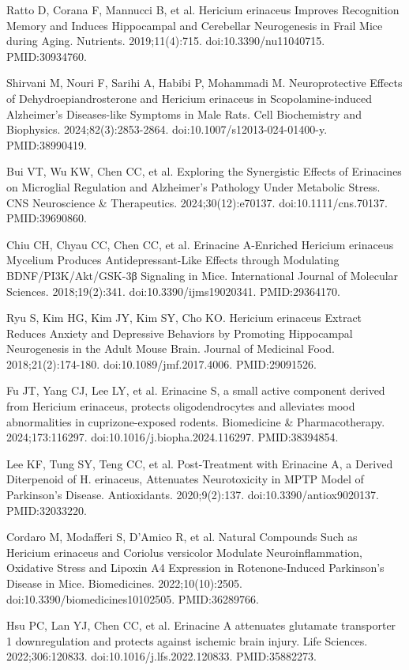 \documentclass[12pt,oneside]{book}
\newcommand{\reff}[2]{\par\hangindent=7mm\hangafter=1\noindent[#1]\hspace{2mm}#2\par}
\begin{document}
\reff{29}{Ratto D, Corana F, Mannucci B, et al. Hericium erinaceus Improves Recognition Memory and Induces Hippocampal and Cerebellar Neurogenesis in Frail Mice during Aging. Nutrients. 2019;11(4):715. doi:10.3390/nu11040715. PMID:30934760.}

\reff{30}{Shirvani M, Nouri F, Sarihi A, Habibi P, Mohammadi M. Neuroprotective Effects of Dehydroepiandrosterone and Hericium erinaceus in Scopolamine-induced Alzheimer's Diseases-like Symptoms in Male Rats. Cell Biochemistry and Biophysics. 2024;82(3):2853-2864. doi:10.1007/s12013-024-01400-y. PMID:38990419.}

\reff{31}{Bui VT, Wu KW, Chen CC, et al. Exploring the Synergistic Effects of Erinacines on Microglial Regulation and Alzheimer's Pathology Under Metabolic Stress. CNS Neuroscience \& Therapeutics. 2024;30(12):e70137. doi:10.1111/cns.70137. PMID:39690860.}

\reff{32}{Chiu CH, Chyau CC, Chen CC, et al. Erinacine A-Enriched Hericium erinaceus Mycelium Produces Antidepressant-Like Effects through Modulating BDNF/PI3K/Akt/GSK-3β Signaling in Mice. International Journal of Molecular Sciences. 2018;19(2):341. doi:10.3390/ijms19020341. PMID:29364170.}

\reff{33}{Ryu S, Kim HG, Kim JY, Kim SY, Cho KO. Hericium erinaceus Extract Reduces Anxiety and Depressive Behaviors by Promoting Hippocampal Neurogenesis in the Adult Mouse Brain. Journal of Medicinal Food. 2018;21(2):174-180. doi:10.1089/jmf.2017.4006. PMID:29091526.}

\reff{34}{Fu JT, Yang CJ, Lee LY, et al. Erinacine S, a small active component derived from Hericium erinaceus, protects oligodendrocytes and alleviates mood abnormalities in cuprizone-exposed rodents. Biomedicine \& Pharmacotherapy. 2024;173:116297. doi:10.1016/j.biopha.2024.116297. PMID:38394854.}

\reff{35}{Lee KF, Tung SY, Teng CC, et al. Post-Treatment with Erinacine A, a Derived Diterpenoid of H. erinaceus, Attenuates Neurotoxicity in MPTP Model of Parkinson's Disease. Antioxidants. 2020;9(2):137. doi:10.3390/antiox9020137. PMID:32033220.}

\reff{36}{Cordaro M, Modafferi S, D'Amico R, et al. Natural Compounds Such as Hericium erinaceus and Coriolus versicolor Modulate Neuroinflammation, Oxidative Stress and Lipoxin A4 Expression in Rotenone-Induced Parkinson's Disease in Mice. Biomedicines. 2022;10(10):2505. doi:10.3390/biomedicines10102505. PMID:36289766.}

\reff{37}{Hsu PC, Lan YJ, Chen CC, et al. Erinacine A attenuates glutamate transporter 1 downregulation and protects against ischemic brain injury. Life Sciences. 2022;306:120833. doi:10.1016/j.lfs.2022.120833. PMID:35882273.}
\end{document}
